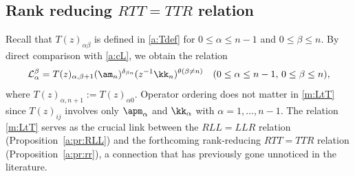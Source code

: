\subsection{Rank reducing \texorpdfstring{$RTT=TTR$}{RTT=TTR} relation}
Recall that \( T(z)_{\alpha \beta} \) is defined in \eqref{a:Tdef}
 for \( 0 \leq \alpha \leq n-1 \) and \( 0 \leq \beta \leq n \).
%
By direct comparison with \eqref{a:cL}, we obtain the relation
\begin{equation} \label{m:LtT}
\mathcal{L}_\alpha^\beta = 
T(z)_{\alpha,\beta+1} 
(\am_n)^{\delta_{\beta n}} (z^{-1}\kk_n)^{\theta(\beta \neq n)}
\quad (0 \leq \alpha \leq n-1, \, 0 \leq \beta \leq n),
\end{equation}
where \( T(z)_{\alpha, n+1} := T(z)_{\alpha 0} \).
Operator ordering does not matter in \eqref{m:LtT} 
since \( T(z)_{ij} \) involves only \( \apm_\alpha \) and \( \kk_\alpha \) 
with \( \alpha = 1, \ldots, n-1 \).
%
The relation \eqref{m:LtT} serves as the crucial link between the $RLL=LLR$ relation (Proposition~\ref{a:pr:RLL}) 
and the forthcoming rank-reducing $RTT=TTR$ relation (Proposition~\ref{a:pr:rr}), 
a connection that has previously gone unnoticed in the literature.
%
